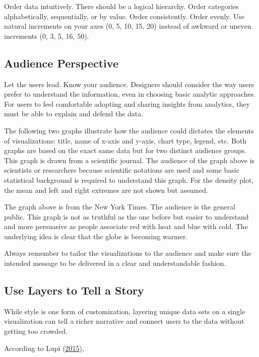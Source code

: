 \documentclass[]{book}
\begin{document}
Order data intuitively. There should be a logical hierarchy. Order categories alphabetically, sequentially, or by value. Order consistently. Order evenly. Use natural increments on your axes (0, 5, 10, 15, 20) instead of awkward or uneven increments (0, 3, 5, 16, 50).

\hypertarget{audience-perspective}{%
\subsection{Audience Perspective}\label{audience-perspective}}

Let the users lead. Know your audience. Designers should consider the way users prefer to understand the information, even in choosing basic analytic approaches. For users to feel comfortable adopting and sharing insights from analytics, they must be able to explain and defend the data.

The following two graphs illustrate how the audience could dictates the elements of visualizations: title, name of x-axis and y-axis, chart type, legend, etc. Both graphs are based on the exact same data but for two distinct audience groups.
This graph is drawn from a scientific journal. The audience of the graph above is scientists or researchers because scientific notations are used and some basic statistical background is required to understand this graph. For the density plot, the mean and left and right extremes are not shown but assumed.

The graph above is from the New York Times. The audience is the general public. This graph is not as truthful as the one before but easier to understand and more persuasive as people associate red with heat and blue with cold. The underlying idea is clear that the globe is becoming warmer.

Always remember to tailor the visualizations to the audience and make sure the intended message to be delivered in a clear and understandable fashion.

\hypertarget{use-layers-to-tell-a-story}{%
\subsection{Use Layers to Tell a Story}\label{use-layers-to-tell-a-story}}

While style is one form of customization, layering unique data sets on a single visualization can tell a richer narrative and connect users to the data without getting too crowded.

According to Lupi (\protect\hyperlink{ref-Lupi}{2015}),
\end{document}

